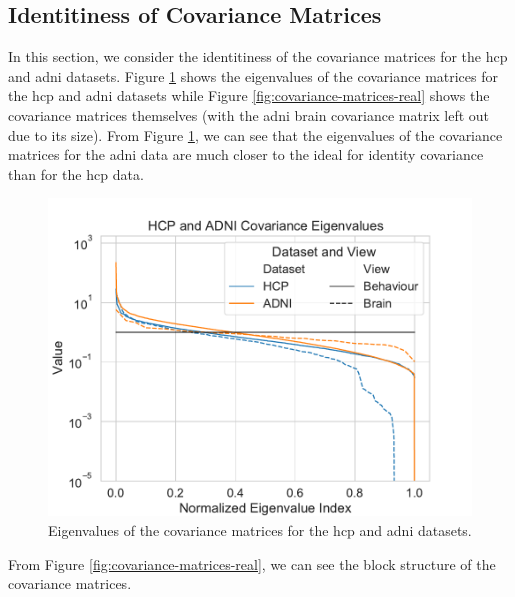 \subsection{Identitiness of Covariance Matrices}
In this section, we consider the identitiness of the covariance matrices for the \acrshort{hcp} and \acrshort{adni} datasets.
Figure \ref{fig:covariance-eigenvalues-real} shows the eigenvalues of the covariance matrices for the \acrshort{hcp} and \acrshort{adni} datasets while Figure \ref{fig:covariance-matrices-real} shows the covariance matrices themselves (with the \acrshort{adni} brain covariance matrix left out due to its size).
From Figure \ref{fig:covariance-eigenvalues-real}, we can see that the eigenvalues of the covariance matrices for the \acrshort{adni} data are much closer to the ideal for identity covariance than for the \acrshort{hcp} data.
\begin{figure}
    \centering
    \includegraphics[width=0.8\linewidth]{figures/covariance/hcp_adni_covariance_eigenvalues}
    \caption{Eigenvalues of the covariance matrices for the \acrshort{hcp} and \acrshort{adni} datasets.}\label{fig:covariance-eigenvalues-real}
\end{figure}

From Figure \ref{fig:covariance-matrices-real}, we can see the block structure of the covariance matrices.

